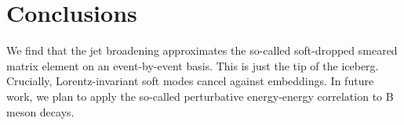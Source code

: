 \section{Conclusions}\label{sec:conclusions}

We find that the jet broadening approximates the so-called soft-dropped
smeared matrix element on an event-by-event basis. This is just the tip
of the iceberg. Crucially, Lorentz-invariant soft modes cancel against
embeddings. In future work, we plan to apply the so-called perturbative
energy-energy correlation to B meson decays.

